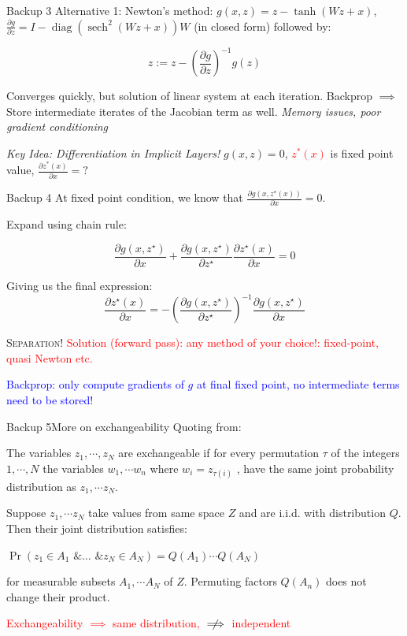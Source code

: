 \documentclass[usenames,dvipsnames]{beamer}
\theoremstyle{definition}
\let\oldcite=\cite
\renewcommand{\cite}[2][]{\textcolor{green}{\oldcite[#1]{#2}}}
\begin{document}
\begin{frame}{Backup 3}
Alternative 1: Newton's method: $g(x, z) = z - \tanh (Wz + x)$, $\frac{\partial g}{\partial z} = I - \operatorname{diag} (\operatorname{sech}^2(Wz + x))W$ (in closed form) followed by:

$$z := z - \left(\frac{\partial g}{\partial z}\right)^{-1} g(z)$$

Converges quickly, but solution of linear system at each iteration.
Backprop $\implies$ Store intermediate iterates of the Jacobian term as well. \emph{Memory issues, poor gradient conditioning}


\emph{Key Idea: Differentiation in Implicit Layers!}
$g(x, z)=0$, \textcolor{red}{$z^{\ast}(x)$} is fixed point value, $\frac{\partial z^{\ast}(x)}{\partial x}=?$

\end{frame}

\begin{frame}{Backup 4}
    At fixed point condition, we know that $\frac{\partial g(x,z^\star(x))}{\partial x}=0.$

    Expand using chain rule: 

    $$\frac{\partial g(x,z^\star)}{\partial x}+\frac{\partial g(x,z^\star)}{\partial z^\star}\frac{\partial z^\star(x)}{\partial x}=0$$

    Giving us the final expression:
    $$\frac{\partial z^\star(x)}{\partial x}=-\left(\frac{\partial g(x,z^\star)}{\partial z^\star}\right)^{-1}\frac{\partial g(x,z^\star)}{\partial x}$$

    \textsc{Separation!}
    \textcolor{red}{Solution (forward pass): any method of your choice!: fixed-point, quasi Newton etc.}

    \textcolor{blue}{Backprop: only compute gradients of $g$ at final fixed point, no intermediate terms need to be stored!}
\end{frame}

\begin{frame}{Backup 5}{More on exchangeability}
Quoting from: \cite{shafer08}

The variables $z_1,\cdots ,z_N$ are exchangeable if for every permutation $\tau$ of the integers $1,\cdots,N$ the variables $w_1, \cdots w_n$ where $w_{i} = z_{\tau(i)}$
, have the same joint probability distribution as $z_1, \cdots z_N$.

Suppose $z_1, \cdots z_N$ take values from same space $Z$ and are i.i.d. with distribution $Q$. Then their joint distribution satisfies:

$\Pr(z_1\in A_1\text{ \& }\ldots \text{ \& } z_N\in A_N)=Q(A_1)\cdots Q(A_N)$

for measurable subsets $A_1, \cdots A_N$ of $Z$. Permuting factors $Q(A_n)$ does not change their product.

\textcolor{red}{Exchangeability $\implies$ same distribution, $\centernot \implies$ independent}

\end{frame}
\end{document}
